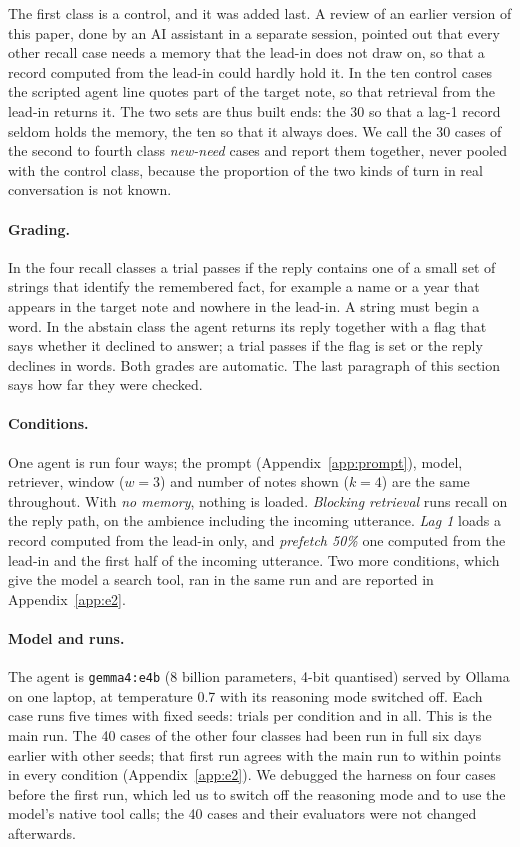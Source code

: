 \documentclass[10pt]{article}
\begin{document}
The first class is a control, and it was added last. A review of an earlier version of this paper, done by an AI assistant in a separate session, pointed out that every other recall case needs a memory that the lead-in does not draw on, so that a record computed from the lead-in could hardly hold it. In the ten control cases the scripted agent line quotes part of the target note, so that retrieval from the lead-in returns it. The two sets are thus built ends: the 30 so that a lag-1 record seldom holds the memory, the ten so that it always does. We call the 30 cases of the second to fourth class \emph{new-need} cases and report them together, never pooled with the control class, because the proportion of the two kinds of turn in real conversation is not known.

\paragraph{Grading.} In the four recall classes a trial passes if the reply contains one of a small set of strings that identify the remembered fact, for example a name or a year that appears in the target note and nowhere in the lead-in. A string must begin a word. In the abstain class the agent returns its reply together with a flag that says whether it declined to answer; a trial passes if the flag is set or the reply declines in words. Both grades are automatic. The last paragraph of this section says how far they were checked.

\paragraph{Conditions.} One agent is run four ways; the prompt (Appendix~\ref{app:prompt}), model, retriever, window ($w=3$) and number of notes shown ($k=4$) are the same throughout. With \emph{no memory}, nothing is loaded. \emph{Blocking retrieval} runs recall on the reply path, on the ambience including the incoming utterance. \emph{Lag 1} loads a record computed from the lead-in only, and \emph{prefetch 50\%} one computed from the lead-in and the first half of the incoming utterance. Two more conditions, which give the model a search tool, ran in the same run and are reported in Appendix~\ref{app:e2}.

\paragraph{Model and runs.} The agent is \texttt{gemma4:e4b} (8 billion parameters, 4-bit quantised) served by Ollama on one laptop, at temperature 0.7 with its reasoning mode switched off. Each case runs five times with fixed seeds: \EtwoPerCondition{} trials per condition and \EtwoTrials{} in all. This is the main run. The 40 cases of the other four classes had been run in full six days earlier with other seeds; that first run agrees with the main run to within \FrMaxDiff{} points in every condition (Appendix~\ref{app:e2}). We debugged the harness on four cases before the first run, which led us to switch off the reasoning mode and to use the model's native tool calls; the 40 cases and their evaluators were not changed afterwards.
\end{document}
